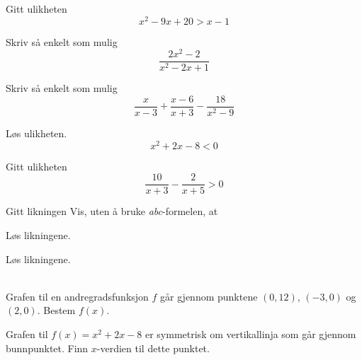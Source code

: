 Gitt ulikheten 
\[ x^2-9x+20>x-1 \]

Skriv så enkelt som mulig
\[ \frac{2x^2-2}{x^2-2x +1} \]

Skriv så enkelt som mulig
\[ \frac{x}{x-3}+\frac{x-6}{x+3}-\frac{18}{x^2-9} \]

Løs ulikheten.
\[ x^2+2x-8 < 0 \]

\newpage
{}
Gitt ulikheten
\[ \frac{10}{x+3}-\frac{2}{x+5}>0 \]

\nes
{} 
Gitt likningen
Vis, uten å bruke \textit{abc}-formelen, at

Løs likningene.\os
{}\\[12pt]

Løs likningene.\os
{}
\\[12pt]
\\[12pt]

Grafen til en andregradsfunksjon $ f $ går gjennom punktene $ (0, 12) $, $ (-3, 0) $ og $ (2, 0) $. Bestem $ f(x) $.

\newpage
{}
Grafen til $ {f(x)=x^2+2x-8} $ er symmetrisk om vertikallinja som går gjennom bunnpunktet. Finn $ x $-verdien til dette punktet.

